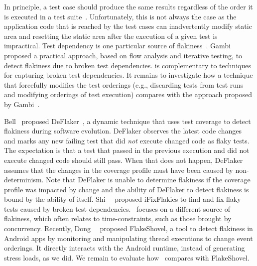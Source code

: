 \documentclass[conference]{IEEEtran}
\begin{document}
In principle, a test case should produce the same results regardless of the order it is executed in a test suite~\cite{DBLP:conf/issta/ZhangJWMLEN14}. Unfortunately, this is not always the case as the application code that is reached by the test cases can inadvertently modify static area and resetting the static area after the execution of a given test is impractical. Test dependency is one particular source of flakiness~\cite{Luo:2014:EAF:2635868.2635920}. Gambi~\etal{}~\cite{gambi2018practical} proposed a practical approach, based on flow analysis and iterative testing, to detect flakiness due to broken test dependencies. \tname{} is complementary to techniques for capturing broken test dependencies. It remains to investigate how a technique that forcefully modifies the test orderings (e.g.{}, discarding tests from test runs and modifying orderings of test execution) compares with the approach proposed by Gambi~\etal.

Bell~\etal{} proposed DeFlaker~\cite{bell2018d}, a dynamic technique that uses test coverage to detect flakiness during software evolution. DeFlaker observes the latest code changes and marks any new failing test that did \emph{not} execute changed code as flaky tests. The expectation is that a test that passed in the previous execution and did not execute changed code should still pass. When that does not happen, DeFlaker assumes that the changes in the coverage profile must have been caused by non-determinism. Note that DeFlaker is unable to determine flakiness if the coverage profile was impacted by change and the ability of DeFlaker to detect flakiness is bound by the ability of \rerun{} itself. Shi~\etal{}~\cite{ifixflakies} proposed iFixFlakies to find and fix flaky tests caused by broken test dependencies. \tname\ focuses on a different source of flakiness, which often relates to time-constraints, such as those brought by concurrency. Recently, Dong~\etal{}~\cite{dong2020concurrencyrelated} proposed FlakeShovel, a tool to detect flakiness in Android apps by monitoring and manipulating thread executions to change event orderings. It directly interacts with the Android runtime, instead of generating stress loads, as we did. We remain to evaluate how \tname\ compares with FlakeShovel. %

\end{document}
